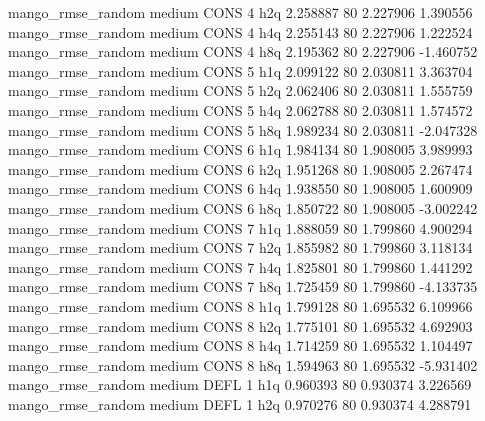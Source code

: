 mango_rmse_random     medium     CONS                 4                  h2q  2.258887 80       2.227906           1.390556
mango_rmse_random     medium     CONS                 4                  h4q  2.255143 80       2.227906           1.222524
mango_rmse_random     medium     CONS                 4                  h8q  2.195362 80       2.227906          -1.460752
mango_rmse_random     medium     CONS                 5                  h1q  2.099122 80       2.030811           3.363704
mango_rmse_random     medium     CONS                 5                  h2q  2.062406 80       2.030811           1.555759
mango_rmse_random     medium     CONS                 5                  h4q  2.062788 80       2.030811           1.574572
mango_rmse_random     medium     CONS                 5                  h8q  1.989234 80       2.030811          -2.047328
mango_rmse_random     medium     CONS                 6                  h1q  1.984134 80       1.908005           3.989993
mango_rmse_random     medium     CONS                 6                  h2q  1.951268 80       1.908005           2.267474
mango_rmse_random     medium     CONS                 6                  h4q  1.938550 80       1.908005           1.600909
mango_rmse_random     medium     CONS                 6                  h8q  1.850722 80       1.908005          -3.002242
mango_rmse_random     medium     CONS                 7                  h1q  1.888059 80       1.799860           4.900294
mango_rmse_random     medium     CONS                 7                  h2q  1.855982 80       1.799860           3.118134
mango_rmse_random     medium     CONS                 7                  h4q  1.825801 80       1.799860           1.441292
mango_rmse_random     medium     CONS                 7                  h8q  1.725459 80       1.799860          -4.133735
mango_rmse_random     medium     CONS                 8                  h1q  1.799128 80       1.695532           6.109966
mango_rmse_random     medium     CONS                 8                  h2q  1.775101 80       1.695532           4.692903
mango_rmse_random     medium     CONS                 8                  h4q  1.714259 80       1.695532           1.104497
mango_rmse_random     medium     CONS                 8                  h8q  1.594963 80       1.695532          -5.931402
mango_rmse_random     medium     DEFL                 1                  h1q  0.960393 80       0.930374           3.226569
mango_rmse_random     medium     DEFL                 1                  h2q  0.970276 80       0.930374           4.288791
